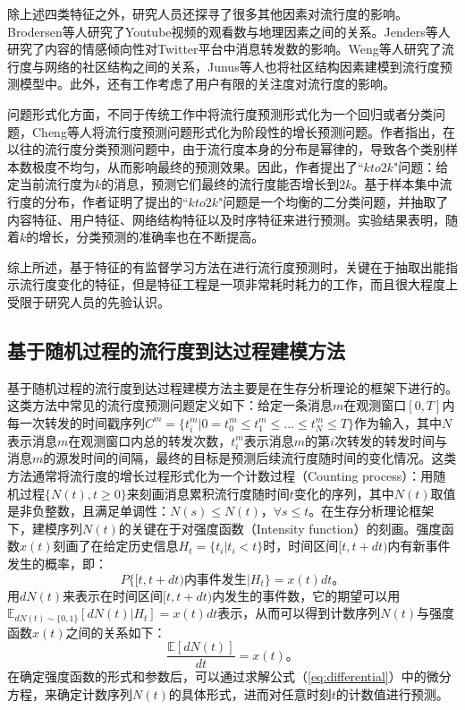 除上述四类特征之外，研究人员还探寻了很多其他因素对流行度的影响。Brodersen等人\citep{brodersen2012youtube}研究了Youtube视频的观看数与地理因素之间的关系。Jenders等人\citep{jenders2013analyzing}研究了内容的情感倾向性对Twitter平台中消息转发数的影响。Weng等人\citep{weng2013virality}研究了流行度与网络的社区结构之间的关系，Junus等人\citep{junus2015community}也将社区结构因素建模到流行度预测模型中。此外，还有工作考虑了用户有限的关注度对流行度的影响\citep{hodas2012visibility,weng2012competition}。

问题形式化方面，不同于传统工作中将流行度预测形式化为一个回归或者分类问题，Cheng等人\citep{cheng2014can}将流行度预测问题形式化为阶段性的增长预测问题。作者指出，在以往的流行度分类预测问题中，由于流行度本身的分布是幂律的，导致各个类别样本数极度不均匀，从而影响最终的预测效果。因此，作者提出了``$kto2k$"问题：给定当前流行度为$k$的消息，预测它们最终的流行度能否增长到$2k$。基于样本集中流行度的分布，作者证明了提出的``$kto2k$"问题是一个均衡的二分类问题，并抽取了内容特征、用户特征、网络结构特征以及时序特征来进行预测。实验结果表明，随着$k$的增长，分类预测的准确率也在不断提高。

综上所述，基于特征的有监督学习方法在进行流行度预测时，关键在于抽取出能指示流行度变化的特征，但是特征工程是一项非常耗时耗力的工作，而且很大程度上受限于研究人员的先验认识。

\subsection{基于随机过程的流行度到达过程建模方法}
基于随机过程的流行度到达过程建模方法主要是在生存分析理论\citep{klein2005survival}的框架下进行的。这类方法中常见的流行度预测问题定义如下：给定一条消息$m$在观测窗口$[0,T]$内每一次转发的时间戳序列$C^m=\{t_i^m|0=t_0^m \le t_1^m \le...\le t_N^m \le T \}$作为输入，其中$N$表示消息$m$在观测窗口内总的转发次数，$t_i^m$表示消息$m$的第$i$次转发的转发时间与消息$m$的源发时间的间隔，最终的目标是预测后续流行度随时间的变化情况。这类方法通常将流行度的增长过程形式化为一个计数过程（Counting process）\citep{andersen1985counting}：用随机过程$\{N(t),t \ge 0\}$来刻画消息累积流行度随时间$t$变化的序列，其中$N(t)$取值是非负整数，且满足单调性：$N(s) \le N(t)\text{，} \forall s \le t$。在生存分析理论框架下，建模序列$N(t)$的关键在于对强度函数（Intensity function）的刻画。强度函数$x(t)$刻画了在给定历史信息$H_t=\{t_i|t_i < t \}$时，时间区间$[t,t+dt)$内有新事件发生的概率，即：
\begin{equation}
\label{eq:intensity}
P\{[t,t+dt)\text{内事件发生} | H_t\}=x(t)dt\text{。}
\end{equation}
用$dN(t)$来表示在时间区间$[t,t+dt)$内发生的事件数，它的期望可以用$\mathbb{E}_{dN(t) \sim \{0,1\}}[dN(t)|H_t]=x(t)dt$表示，从而可以得到计数序列$N(t)$与强度函数$x(t)$之间的关系如下：
\begin{equation}
\label{eq:differential}
\frac{\mathbb{E}[dN(t)]}{dt}=x(t)\text{。}
\end{equation}
在确定强度函数的形式和参数后，可以通过求解公式（\ref{eq:differential}）中的微分方程，来确定计数序列$N(t)$的具体形式，进而对任意时刻$t$的计数值进行预测。

